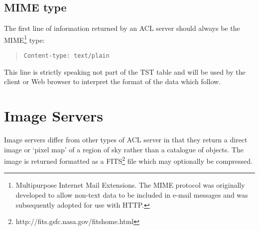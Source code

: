 \documentclass[twoside,11pt]{article}
\newcommand{\htmladdnormallinkfoot}[2]{#1\footnote{#2}}
\newcommand{\xlabel}[1]{}
\renewcommand{\_}{\texttt{\symbol{95}}}
\begin{document}
\subsection{\label{MIME_R}MIME type}

The first line of information returned by an ACL server should always
be the MIME\footnote{Multipurpose Internet Mail Extensions.  The MIME
protocol was originally developed to allow non-text data to be included
in e-mail messages and was subsequently adopted for use with HTTP.} type:

\begin{quote}
{\tt Content-type: text/plain}
\end{quote}

This line is strictly speaking not part of the TST table and will be
used by the client or Web browser to interpret the format of the data
which follow.


\section{\xlabel{IMAGE_R}\label{IMAGE_R}Image Servers}

Image servers differ from other types of ACL server in that they return
a direct image or `pixel map' of a region of sky rather than a catalogue
of objects.  The image is returned formatted as a 
\htmladdnormallinkfoot{FITS}{http://fits.gsfc.nasa.gov/fits\_home.html}
file which may optionally be compressed.
\end{document}
